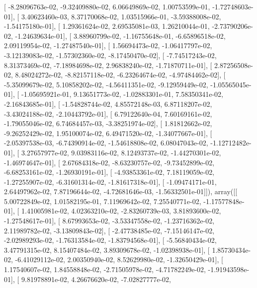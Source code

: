 \documentclass{article}
\begin{document}
       [ -8.28096763e-02,  -9.32409880e-02,   6.06649869e-02,
          1.00753599e-01,  -1.72748603e-01],
       [  3.40623460e-03,   8.37170068e-02,   1.03515966e-01,
         -3.59388008e-02,  -1.54175180e-01],
       [  1.29361624e-02,   2.69535081e-03,   1.26210044e-01,
         -2.73790206e-02,  -1.24639634e-01],
       [  3.88960799e-02,  -1.16755648e-01,  -6.65896518e-02,
          2.09119954e-02,  -1.27487540e-01],
       [  1.56694473e-02,  -1.06417797e-02,  -3.12139083e-02,
         -1.57302360e-02,  -8.17450470e-02],
       [ -7.74517243e-02,   8.31373469e-02,  -7.18984698e-02,
          2.96838240e-02,  -1.71870711e-01],
       [  2.87256508e-02,   8.48024272e-02,  -8.82157118e-02,
         -6.23264674e-02,  -4.97484462e-02],
       [ -5.35099679e-02,   5.10858202e-02,  -4.56411351e-02,
         -9.12959449e-02,  -1.05565045e-01],
       [ -1.05695921e-01,   9.13651773e-02,  -1.02883301e-01,
          7.58350341e-02,  -2.16843685e-01],
       [ -1.54828744e-02,   4.85572148e-03,   6.87118207e-02,
         -3.43024188e-02,  -2.10443792e-01],
       [  6.79122640e-04,   7.60169161e-02,  -1.79055046e-02,
          6.74684457e-03,  -3.38251974e-02],
       [  1.81812662e-02,  -9.26252429e-02,   1.95100074e-02,
          6.49471520e-02,  -1.34077667e-01],
       [ -2.05397538e-03,  -6.74390914e-02,  -1.54618808e-02,
          6.08047043e-02,  -1.12712482e-01],
       [  3.27657977e-02,   9.03983116e-02,   8.12493737e-02,
         -1.44270301e-02,  -1.46974647e-01],
       [  2.67684318e-02,  -8.63230757e-02,  -9.73452899e-02,
         -6.68253161e-02,  -1.26930191e-01],
       [ -4.93853361e-02,   7.18119059e-02,  -1.27255907e-02,
         -6.31601314e-02,  -1.81617318e-01],
       [ -1.09474171e-01,   2.64497962e-02,   7.87196644e-02,
         -4.72681646e-03,  -1.56332501e-01]]), array([[  5.00722849e-02,   1.01582195e-01,   7.11969642e-02,
          7.25540771e-02,  -1.17577848e-01],
       [  1.41005981e-02,   4.02363210e-02,  -2.83260739e-03,
          3.81893600e-02,  -1.27548617e-01],
       [  8.67993653e-02,  -3.53347558e-02,  -1.23716362e-02,
          2.11989782e-02,  -3.13809843e-02],
       [ -2.47738485e-02,  -7.15146147e-02,  -2.02989293e-02,
         -1.76313584e-02,  -1.83794568e-01],
       [ -5.56840434e-02,   3.47791315e-02,   8.15407484e-02,
          3.89309678e-02,  -1.02398938e-01],
       [  1.85730434e-02,  -6.41029112e-02,   2.00350940e-02,
          8.52629980e-02,  -1.32650429e-01],
       [  1.17540607e-02,   1.84558848e-02,  -2.71505978e-02,
         -4.71782249e-02,  -1.91943598e-01],
       [  9.81978891e-02,   4.26676620e-02,  -7.02827777e-02,
\end{document}

